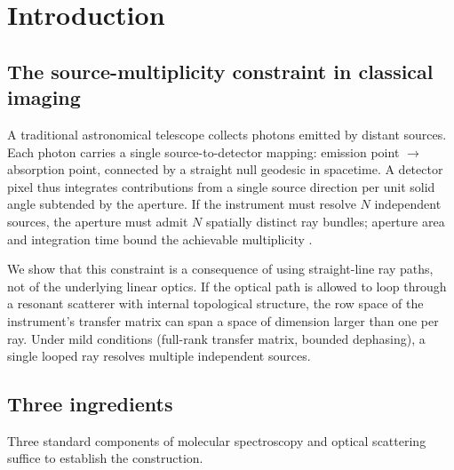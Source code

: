 \documentclass[11pt,twocolumn,a4paper]{article}
\theoremstyle{definition}
\theoremstyle{remark}
\begin{document}
\section{Introduction}
\label{sec:introduction}

\subsection{The source-multiplicity constraint in classical imaging}

A traditional astronomical telescope collects photons emitted by distant sources. Each photon carries a single source-to-detector mapping: emission point $\to$ absorption point, connected by a straight null geodesic in spacetime. A detector pixel thus integrates contributions from a single source direction per unit solid angle subtended by the aperture. If the instrument must resolve $N$ independent sources, the aperture must admit $N$ spatially distinct ray bundles; aperture area and integration time bound the achievable multiplicity \citep{born1999,saleh2007}.

We show that this constraint is a consequence of using straight-line ray paths, not of the underlying linear optics. If the optical path is allowed to loop through a resonant scatterer with internal topological structure, the row space of the instrument's transfer matrix can span a space of dimension larger than one per ray. Under mild conditions (full-rank transfer matrix, bounded dephasing), a single looped ray resolves multiple independent sources.

\subsection{Three ingredients}

Three standard components of molecular spectroscopy and optical scattering suffice to establish the construction.
\end{document}
